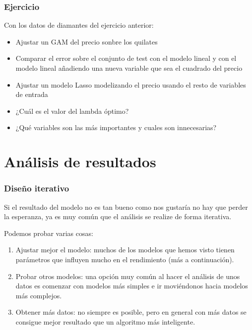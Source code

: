 \documentclass{beamer}
\newenvironment{wideitemize}{\itemize\addtolength{\itemsep}{12pt}}{\enditemize}
\begin{document}
\begin{frame}
\frametitle{Ejercicio}
Con los datos de diamantes del ejercicio anterior:
\begin{itemize}
\item Ajustar un GAM del precio sonbre los quilates
\item Comparar el error sobre el conjunto de test con el modelo lineal y con el modelo lineal añadiendo una nueva variable que sea el cuadrado del precio

\item Ajustar un modelo Lasso modelizando el precio usando el resto de variables de entrada
\item ¿Cuál es el valor del lambda óptimo?
\item ¿Qué variables son las más importantes y cuales son innecesarias?
\end{itemize}
\end{frame}


\section{Análisis de resultados}

\begin{frame}
\frametitle{Diseño iterativo}

\begin{wideitemize}
\item Si el resultado del modelo no es tan bueno como nos gustaría no hay que perder la esperanza, ya es muy común que el análisis se realize de forma iterativa.
\item Podemos probar varias cosas:
\begin{enumerate}
\item Ajustar mejor el modelo: muchos de los modelos que hemos visto tienen parámetros que influyen mucho en el rendimiento (más a continuación).
\item Probar otros modelos: una opción muy común al hacer el análisis de unos datos es comenzar con modelos más simples e ir moviéndonos hacia modelos más complejos.
\item Obtener más datos: no siempre es posible, pero en general con más datos se consigue mejor resultado que un algoritmo más inteligente.
\end{enumerate}
\end{wideitemize}
\end{frame}
\end{document}
